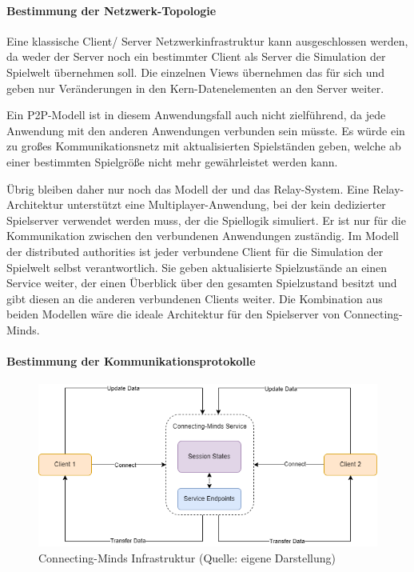 \paragraph{Bestimmung der Netzwerk-Topologie}

Eine klassische Client/ Server Netzwerkinfrastruktur kann ausgeschlossen werden, da weder der Server noch ein bestimmter Client als Server die Simulation der Spielwelt übernehmen soll. Die einzelnen Views übernehmen das für sich und geben nur Veränderungen in den Kern-Datenelementen an den Server weiter. 

Ein \ac{P2P}-Modell ist in diesem Anwendungsfall auch nicht zielführend, da jede Anwendung mit den anderen Anwendungen verbunden sein müsste. Es würde ein zu großes Kommunikationsnetz mit aktualisierten Spielständen geben, welche ab einer bestimmten Spielgröße nicht mehr gewährleistet werden kann. 

Übrig bleiben daher nur noch das Modell der  und das Relay-System. Eine Relay-Architektur unterstützt eine Multiplayer-Anwendung, bei der kein dedizierter Spielserver verwendet werden muss, der die Spiellogik simuliert. Er ist nur für die Kommunikation zwischen den verbundenen Anwendungen zuständig. Im Modell der distributed authorities ist jeder verbundene Client für die Simulation der Spielwelt selbst verantwortlich. Sie geben aktualisierte Spielzustände an einen Service weiter, der einen Überblick über den gesamten Spielzustand besitzt und gibt diesen an die anderen verbundenen Clients weiter. Die Kombination aus beiden Modellen wäre die ideale Architektur für den Spielserver von Connecting-Minds.

\paragraph{Bestimmung der Kommunikationsprotokolle}

\begin{figure}[ht]
\centering
\includegraphics[width=1\linewidth]{content/pictures/CM-Archticture.png}
\caption{Connecting-Minds Infrastruktur (Quelle: eigene Darstellung)}
\label{fig:cm-topology}
\end{figure}

